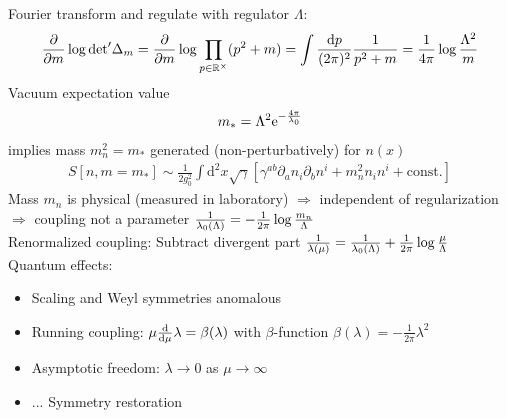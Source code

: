 \documentclass[12pt]{article}
\begin{document}
Fourier transform and regulate with regulator $\Lambda$:
\begin{eqnarray}
{\partial \over \partial m} \log {\det}^\prime \Delta_m 
=  {\partial \over \partial m} \log \prod_{p\in \mathbb R^\times} (p^2 + m)
= \int {\mathrm d p\over (2\pi)^2} {1\over  p^2 + m}
=\frac1{4\pi} \log {\Lambda^2 \over m}
\end{eqnarray}
Vacuum expectation value
\begin{eqnarray}
m_*= \Lambda^2 \mathrm e^{-{4\pi\over \lambda_0}}
\end{eqnarray}
implies mass $m^2_n = m_*$ generated (non-perturbatively) for $n(x)$ 
\begin{eqnarray}
S[ n, m=m_*] \sim \frac 1{2g_0^2} \int \mathrm d^2 x \sqrt{\gamma} \left[ \gamma^{ab} \partial_a n_i \partial_b n^i + m^2_n n_i n^i +\mathrm{const.}\right]
\end{eqnarray}
Mass $m_n$ is physical (measured in laboratory) $\Rightarrow$ independent of regularization $\Rightarrow$ coupling not a parameter ${1\over \lambda_0(\Lambda)} = -\frac 1{2\pi} \log {m_n\over \Lambda}$\\
Renormalized coupling: Subtract divergent part ${1\over \lambda(\mu)} = {1\over \lambda_0(\Lambda)} +\frac 1{2\pi} \log {\mu\over \Lambda}$\\

Quantum effects:
\begin{itemize}
\item Scaling and Weyl symmetries anomalous
\item Running coupling: $\mu {\mathrm d\over \mathrm d \mu} \lambda = \beta(\lambda)$ with $\beta$-function $\beta(\lambda)=-\frac1{2\pi} \lambda^2$ %
\item Asymptotic freedom: $\lambda \to 0$ as $\mu\to \infty$
\item ... Symmetry restoration
\end{itemize}


\end{document}

